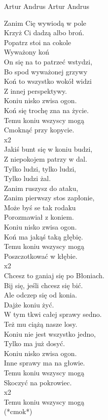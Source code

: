 {Artur Andrus}
{Artur Andrus}
\begin{text}
Zanim Cię wywiodą w pole\\
Krzyż Ci dadzą albo broń.\\
Popatrz stoi na cokole\\
Wyważony koń\\

On się na to patrzeć wstydzi,\\
Bo spod wyważonej grzywy \\
Koń to wszystko wokół widzi\\
Z innej perspektywy.\\

Koniu nisko zwisa ogon.\\
Koń się trochę zna na życie.\\
Temu koniu wszyscy mogą\\
Cmoknąć przy kopycie.\\
x2\\

Jakiś bunt się w koniu budzi,\\
Z niepokojem patrzy w dal.\\
Tylko ludzi, tylko ludzi,\\
Tylko ludzi żal.\\

Zanim ruszysz do ataku,\\
Zanim pierwszy stos zapłonie,\\
Może byś se tak rodaku\\
Porozmawiał z koniem.\\

Koniu nisko zwisa ogon.\\
Koń ma jakąś taką głębię.\\
Temu koniu wszyscy mogą\\
Poszczotkować w kłębie.\\
x2\\

Chcesz to ganiaj się po Błoniach.\\
Bij się, jeśli chcesz się bić.\\
Ale odczep się od konia.\\
Dajże koniu żyć.\\

W tym tkwi całej sprawy sedno.\\
Też mu ciążą nasze losy.\\
Koniu nie jest wszystko jedno,\\
Tylko ma już dosyć.\\

Koniu nisko zwisa ogon.\\
Inne sprawy ma na głowie.\\
Temu koniu wszyscy mogą\\
Skoczyć na pokrowiec.\\
x2\\

Temu koniu wszyscy mogą\\
(*cmok*)\\
\end{text}
\begin{chord}
\end{chord}
